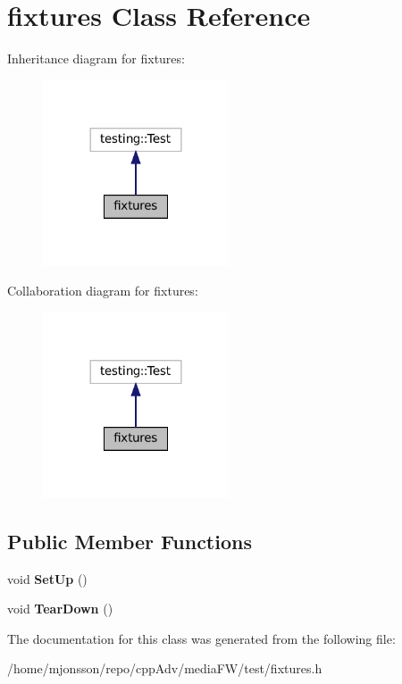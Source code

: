 \hypertarget{classfixtures}{}\section{fixtures Class Reference}
\label{classfixtures}


Inheritance diagram for fixtures\+:
\nopagebreak
\begin{figure}[H]
\begin{center}
\leavevmode
\includegraphics[width=156pt]{classfixtures__inherit__graph}
\end{center}
\end{figure}


Collaboration diagram for fixtures\+:
\nopagebreak
\begin{figure}[H]
\begin{center}
\leavevmode
\includegraphics[width=156pt]{classfixtures__coll__graph}
\end{center}
\end{figure}
\subsection*{Public Member Functions}
\begin{DoxyCompactItemize}
\item 
\mbox{\label{classfixtures_abc36cc117cfa8add84b74ea4ba04578e}} 
void {\bfseries Set\+Up} ()
\item 
\mbox{\label{classfixtures_a538d76e0886b33e3c8b6afa9a592ba0e}} 
void {\bfseries Tear\+Down} ()
\end{DoxyCompactItemize}


The documentation for this class was generated from the following file\+:\begin{DoxyCompactItemize}
\item 
/home/mjonsson/repo/cpp\+Adv/media\+F\+W/test/fixtures.\+h\end{DoxyCompactItemize}
